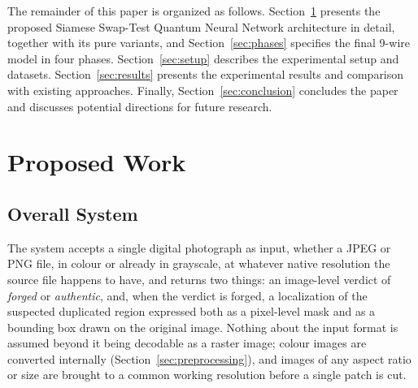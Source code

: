 \documentclass[conference]{IEEEtran}
\begin{document}
The remainder of this paper is organized as follows. Section~\ref{sec:proposed} presents the proposed Siamese Swap-Test Quantum Neural Network architecture in detail, together with its pure variants, and Section~\ref{sec:phases} specifies the final 9-wire model in four phases. Section~\ref{sec:setup} describes the experimental setup and datasets. Section~\ref{sec:results} presents the experimental results and comparison with existing approaches. Finally, Section~\ref{sec:conclusion} concludes the paper and discusses potential directions for future research.

\section{Proposed Work}\label{sec:proposed}

\subsection{Overall System}\label{sec:overall}
The system accepts a single digital photograph as input, whether a JPEG or PNG file, in colour or already in grayscale, at whatever native resolution the source file happens to have, and returns two things: an image-level verdict of \emph{forged} or \emph{authentic}, and, when the verdict is forged, a localization of the suspected duplicated region expressed both as a pixel-level mask and as a bounding box drawn on the original image. Nothing about the input format is assumed beyond it being decodable as a raster image; colour images are converted internally (Section~\ref{sec:preprocessing}), and images of any aspect ratio or size are brought to a common working resolution before a single patch is cut.
\end{document}
